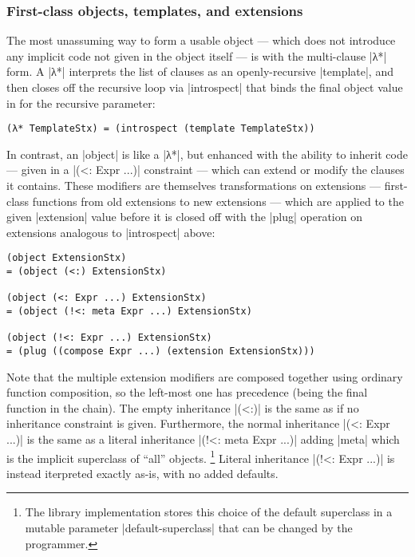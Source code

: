 \subsubsection{First-class objects, templates, and extensions}

The most unassuming way to form a usable object --- which does not introduce any implicit code not given in the object itself --- is with the multi-clause \scm|λ*| form.  A \scm|λ*| interprets the list of clauses as an openly-recursive \scm|template|, and then closes off the recursive loop via \scm|introspect| that binds the final object value in for the recursive parameter:
\begin{verbatim}
(λ* TemplateStx) = (introspect (template TemplateStx))
\end{verbatim}

In contrast, an \scm|object| is like a \scm|λ*|, but enhanced with the ability to inherit code --- given in a \scm|(<: Expr ...)| constraint --- which can extend or modify the clauses it contains.
These modifiers are themselves transformations on extensions --- first-class functions from old extensions to new extensions --- which are applied to the given \scm|extension| value before it is closed off with the \scm|plug| operation on extensions analogous to \scm|introspect| above:
\begin{verbatim}
(object ExtensionStx)
= (object (<:) ExtensionStx)

(object (<: Expr ...) ExtensionStx)
= (object (!<: meta Expr ...) ExtensionStx)

(object (!<: Expr ...) ExtensionStx)
= (plug ((compose Expr ...) (extension ExtensionStx)))

\end{verbatim}
Note that the multiple extension modifiers are composed together using ordinary function composition, so the left-most one has precedence (being the final function in the chain).
The empty inheritance \scm|(<:)| is the same as if no inheritance constraint is given.
Furthermore, the normal inheritance \scm|(<: Expr ...)| is the same as a literal inheritance \scm|(!<: meta Expr ...)| adding \scm|meta| which is the implicit superclass of ``all'' objects.%
\footnote{The library implementation stores this choice of the default superclass in a mutable parameter \scm|default-superclass| that can be changed by the programmer.}
Literal inheritance \scm|(!<: Expr ...)| is instead iterpreted exactly as-is, with no added defaults.

